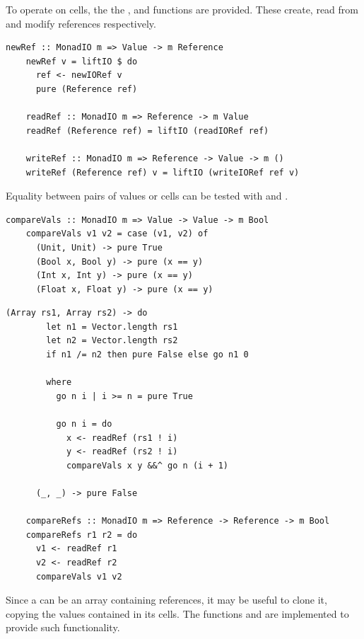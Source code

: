 \documentclass[UdineBachThesis,american,11pt]{PhdThesis}
\begin{document}
  To operate on cells, the the \lstinline@newRef@, \lstinline@readRef@ and
  \lstinline@writeRef@ functions are provided. These create, read from and
  modify references respectively.

  \begin{lstlisting}[gobble=4,basicstyle=\ttfamily\small]
    newRef :: MonadIO m => Value -> m Reference
    newRef v = liftIO $ do
      ref <- newIORef v
      pure (Reference ref)

    readRef :: MonadIO m => Reference -> m Value
    readRef (Reference ref) = liftIO (readIORef ref)

    writeRef :: MonadIO m => Reference -> Value -> m ()
    writeRef (Reference ref) v = liftIO (writeIORef ref v)
  \end{lstlisting}

  Equality between pairs of values or cells can be tested with
  \lstinline@compareVals@ and \lstinline@compareRefs@.

  \begin{lstlisting}[gobble=4,basicstyle=\ttfamily\small]
    compareVals :: MonadIO m => Value -> Value -> m Bool
    compareVals v1 v2 = case (v1, v2) of
      (Unit, Unit) -> pure True
      (Bool x, Bool y) -> pure (x == y)
      (Int x, Int y) -> pure (x == y)
      (Float x, Float y) -> pure (x == y)
  \end{lstlisting}

  \newpage

  \begin{lstlisting}[gobble=4,basicstyle=\ttfamily\small]
      (Array rs1, Array rs2) -> do
        let n1 = Vector.length rs1
        let n2 = Vector.length rs2
        if n1 /= n2 then pure False else go n1 0

        where
          go n i | i >= n = pure True

          go n i = do
            x <- readRef (rs1 ! i)
            y <- readRef (rs2 ! i)
            compareVals x y &&^ go n (i + 1)

      (_, _) -> pure False

    compareRefs :: MonadIO m => Reference -> Reference -> m Bool
    compareRefs r1 r2 = do
      v1 <- readRef r1
      v2 <- readRef r2
      compareVals v1 v2
  \end{lstlisting}

  Since a \lstinline@Value@ can be an array containing references, it may be
  useful to clone it, copying the values contained in its cells. The functions
  \lstinline@cloneVal@ and \lstinline@cloneRef@ are implemented to provide such
  functionality.
\end{document}
